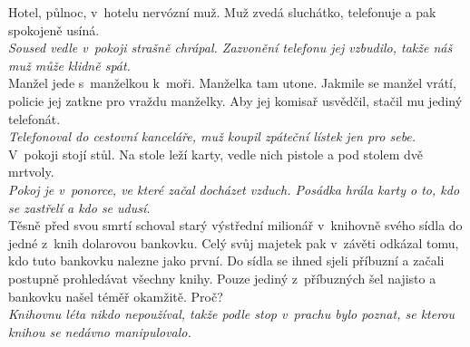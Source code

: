 \begin{multicols}{2}
\noindent
Hotel, půlnoc, v~hotelu nervózní muž. Muž zvedá 
sluchátko, telefonuje a pak spokojeně usíná.\\[1 mm]
{\sl Soused vedle v~pokoji strašně chrápal. Zazvonění telefonu 
jej vzbudilo, takže náš muž může klidně spát.}\\

\noindent
Manžel jede s~manželkou k~moři. Manželka tam utone. Jakmile se
manžel vrátí, policie jej zatkne pro vraždu manželky. Aby jej
komisař usvědčil, stačil mu jediný telefonát.\\[1 mm]
{\sl Telefonoval do cestovní kanceláře, muž koupil zpáteční lístek 
jen pro sebe.}\\

\noindent
V~pokoji stojí stůl. Na stole leží karty, vedle 
nich pistole a pod stolem dvě mrtvoly.\\[1 mm]
{\sl Pokoj je v~ponorce, ve které začal docházet vzduch. 
Posádka hrála karty o to, kdo se zastřelí a kdo se udusí.}\\

\noindent
Těsně před svou smrtí schoval starý výstřední milionář v~knihovně svého sídla
do jedné z~knih dolarovou bankovku. Celý svůj majetek pak v~závěti odkázal
tomu, kdo tuto bankovku nalezne jako první. Do sídla se ihned sjeli příbuzní
a začali postupně prohledávat všechny knihy. Pouze jediný z~příbuzných šel
najisto a bankovku našel téměř okamžitě. Proč?\\[1 mm]
{\sl Knihovnu léta nikdo nepoužíval, takže podle stop v~prachu bylo poznat,
se kterou knihou se nedávno manipulovalo.}\\

\end{multicols}
\clearpage

